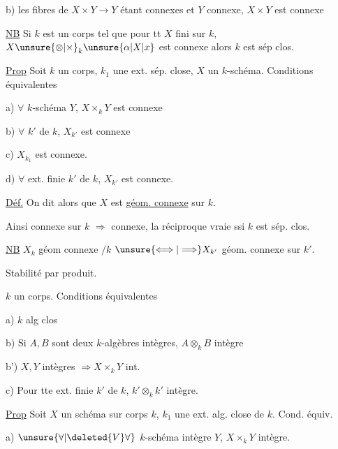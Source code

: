 b) les fibres de $X\times Y\to Y$ étant connexes  et $Y$ connexe, $X\times Y$ est connexe

\uline{NB} Si $k$ est un corps tel que pour tt $X$  fini sur $k$, $X\unsure{\otimes|\times}_k \unsure{\alpha|X|x}$ est connexe alors $k$ est sép clos.

\uline{Prop} Soit $k$ un corps, $k_1$ une ext.  sép. close, $X$ un $k$-schéma. Conditions équivalentes

a) $\forall$ $k$-schéma $Y$, $X\times_k Y$ est connexe

b) $\forall$  $k'$ de $k$, $X_{k'}$ est connexe

c)  $X_{k_1}$ est connexe.

d) $\forall$ ext. finie  $k'$ de $k$, $X_{k'}$ est connexe.


\uline{Déf.} On dit alors que $X$ est \uline{géom. connexe} sur $k$.

Ainsi   connexe sur $k$ $\Rightarrow$ connexe, la réciproque vraie ssi $k$ est sép. clos.

\uline{NB} $X_k$ géom connexe $/k$ $\unsure{\Longleftrightarrow|\Longrightarrow} X_{k'}$ géom. connexe sur $k'$.

Stabilité par produit.


$k$ un corps. Conditions équivalentes


a) $k$ alg clos

b) Si $A,B$ sont deux $k$-algèbres intègres, $A\otimes_k B$ intègre

b')  $X,Y$ intègres $\Rightarrow X\times_k Y$ int.

c) Pour tte ext. finie $k'$ de $k$, $k'\otimes_k k'$ intègre.


\uline{Prop} Soit $X$ un schéma sur corps $k$, $k_1$ une ext. alg. close de $k$. Cond. équiv.

a) $\unsure{\forall|\deleted{V}\forall}$ $k$-schéma intègre $Y$, $X\times_k Y$ intègre.

